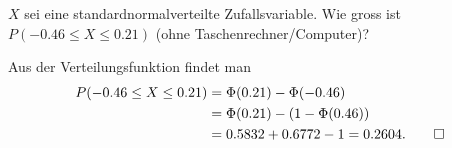 $X$ sei eine standardnormalverteilte Zufallsvariable. Wie gross
ist $P(-0.46\le X\le 0.21)$ (ohne Taschenrechner/Computer)?


\begin{loesung}
Aus der Verteilungsfunktion findet man
\begin{align*}
P(-0.46\le X\le 0.21)
&=\Phi(0.21)-\Phi(-0.46)
\\
&=\Phi(0.21)-(1-\Phi(0.46))
\\
&=0.5832+0.6772-1=0.2604.
\qedhere
\end{align*}
\end{loesung}

